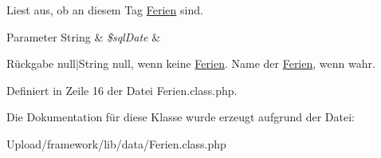 Liest aus, ob an diesem Tag \mbox{\hyperlink{class_ferien}{Ferien}} sind. 
\begin{DoxyParams}[1]{Parameter}
String & {\em \$sql\+Date} & \\
\hline
\end{DoxyParams}
\begin{DoxyReturn}{Rückgabe}
null$\vert$\+String null, wenn keine \mbox{\hyperlink{class_ferien}{Ferien}}. Name der \mbox{\hyperlink{class_ferien}{Ferien}}, wenn wahr. 
\end{DoxyReturn}


Definiert in Zeile 16 der Datei Ferien.\+class.\+php.



Die Dokumentation für diese Klasse wurde erzeugt aufgrund der Datei\+:\begin{DoxyCompactItemize}
\item 
Upload/framework/lib/data/Ferien.\+class.\+php\end{DoxyCompactItemize}
